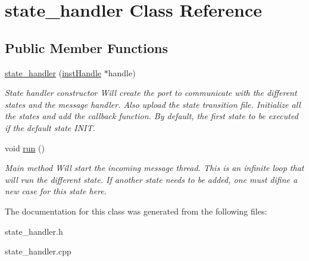 \hypertarget{classstate__handler}{}\section{state\+\_\+handler Class Reference}
\label{classstate__handler}
\subsection*{Public Member Functions}
\begin{DoxyCompactItemize}
\item 
\hyperlink{classstate__handler_afc54feb4ab0f58467d985b4c3f576f7f}{state\+\_\+handler} (\hyperlink{structinstHandle}{inst\+Handle} $\ast$handle)\hypertarget{classstate__handler_afc54feb4ab0f58467d985b4c3f576f7f}{}\label{classstate__handler_afc54feb4ab0f58467d985b4c3f576f7f}

\begin{DoxyCompactList}\small\item\em State handler constructor Will create the port to communicate with the different states and the message handler. Also upload the state transition file. Initialize all the states and add the callback function. By default, the first state to be executed if the default state I\+N\+IT. \end{DoxyCompactList}\item 
void \hyperlink{classstate__handler_af2c111682ecb12378f1497c8b003b936}{run} ()\hypertarget{classstate__handler_af2c111682ecb12378f1497c8b003b936}{}\label{classstate__handler_af2c111682ecb12378f1497c8b003b936}

\begin{DoxyCompactList}\small\item\em Main method Will start the incoming message thread. This is an infinite loop that will run the different state. If another state needs to be added, one must difine a new case for this state here. \end{DoxyCompactList}\end{DoxyCompactItemize}


The documentation for this class was generated from the following files\+:\begin{DoxyCompactItemize}
\item 
state\+\_\+handler.\+h\item 
state\+\_\+handler.\+cpp\end{DoxyCompactItemize}
